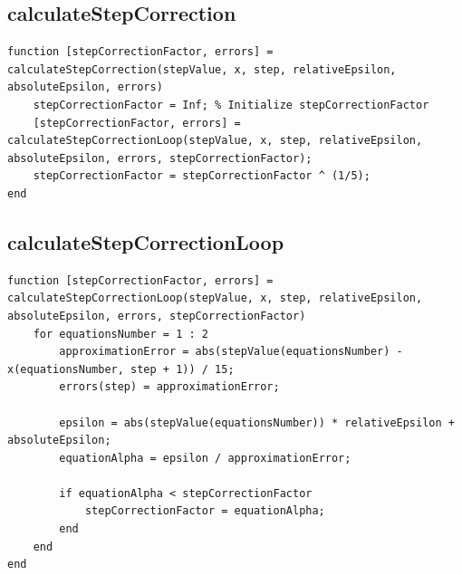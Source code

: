 \subsection{calculateStepCorrection}
\begin{simplechar}
\begin{lstlisting}
function [stepCorrectionFactor, errors] = calculateStepCorrection(stepValue, x, step, relativeEpsilon, absoluteEpsilon, errors)
    stepCorrectionFactor = Inf; % Initialize stepCorrectionFactor
    [stepCorrectionFactor, errors] = calculateStepCorrectionLoop(stepValue, x, step, relativeEpsilon, absoluteEpsilon, errors, stepCorrectionFactor);
    stepCorrectionFactor = stepCorrectionFactor ^ (1/5);
end
\end{lstlisting}
\end{simplechar}

\subsection{calculateStepCorrectionLoop}
\begin{simplechar}
\begin{lstlisting}
function [stepCorrectionFactor, errors] = calculateStepCorrectionLoop(stepValue, x, step, relativeEpsilon, absoluteEpsilon, errors, stepCorrectionFactor)
    for equationsNumber = 1 : 2
        approximationError = abs(stepValue(equationsNumber) - x(equationsNumber, step + 1)) / 15;
        errors(step) = approximationError;

        epsilon = abs(stepValue(equationsNumber)) * relativeEpsilon + absoluteEpsilon;
        equationAlpha = epsilon / approximationError;

        if equationAlpha < stepCorrectionFactor
            stepCorrectionFactor = equationAlpha;
        end
    end
end
\end{lstlisting}
\end{simplechar}

